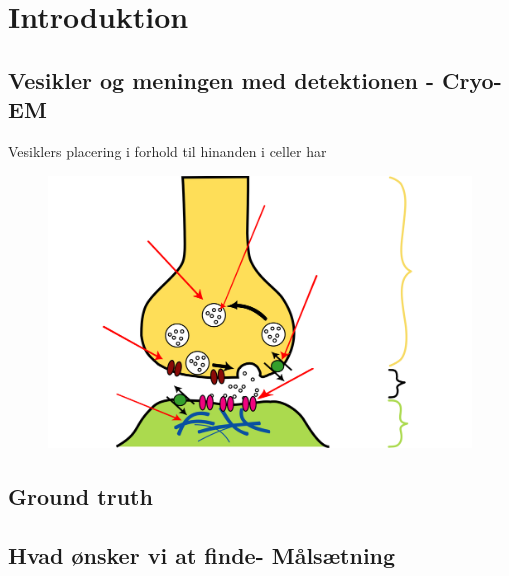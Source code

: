 \section{Introduktion} %
\subsection{Vesikler og meningen med detektionen - Cryo-EM} %
Vesiklers placering i forhold til hinanden i celler har 

\begin{figure}[H]
	\centering
	\includegraphics[scale=0.3]{img/synTransmitter.svg}
\end{figure} 

\subsection{Ground truth}									%
\subsection{Hvad ønsker vi at finde- Målsætning}			%